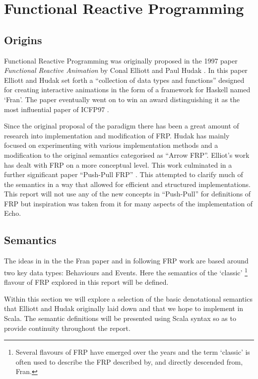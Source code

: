 \chapter{Functional Reactive Programming}
  \section{Origins}
    Functional Reactive Programming was originally proposed in the 1997 paper \emph{Functional
    Reactive Animation} by Conal Elliott and Paul Hudak \cite{Elliott1997}. In this paper Elliott and Hudak
    set forth a ``collection of data types and functions'' designed for creating interactive 
    animations in the form of a framework for Haskell named `Fran'. The paper eventually went on to
    win an award distinguishing it as the most influential paper of ICFP97 \cite{SIGPLAN}. 
    
    Since the original proposal of the paradigm there has been a great amount of research
    into implementation and modification of FRP. Hudak has mainly focused on experimenting with various
    implementation methods and a modification to the original semantics categorised as ``Arrow FRP''. Elliot's
    work has dealt with FRP on a more conceptual level. This work culminated in a further significant paper
    ``Push-Pull FRP'' \cite{Elliott2009}. This attempted to clarify much of the semantics in a way that allowed for efficient 
    and
    structured implementations. This report will not use any of the new concepts in ``Push-Pull'' for definitions
    of FRP but inspiration was taken from it for many aspects of the implementation of Echo.

  \section{Semantics}
    The ideas in in the the Fran paper and in following FRP work are based around two key data types: 
    Behaviours and Events. Here the semantics of the `classic' \footnote{Several
    flavours of FRP have emerged over the years and the term `classic' is often used to describe
    the FRP described by, and directly descended from, Fran.} flavour of FRP explored in this report will be defined.
    
    Within this section we will explore a selection of the basic denotational semantics that Elliott
    and Hudak originally laid down and that we hope to implement in Scala. The semantic definitions will
    be presented using Scala syntax so as to provide continuity throughout the report.
  
